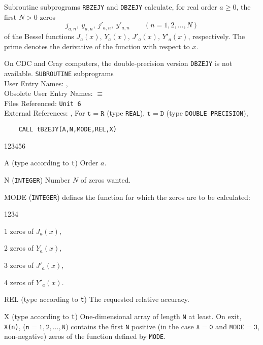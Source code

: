                 
           
\Submitter{}                
                
Subroutine subprograms {\tt RBZEJY} and {\tt DBZEJY} calculate,
for real order $a \ge 0$, the first $N > 0$ zeros
$$j_{a,n}, \ y_{a,n}, \ j'_{a,n}, \ y'_{a,n} \qquad (n=1,2,\ldots,N)$$
of the Bessel functions $J_a(x),\,Y_a(x),\,J'_a(x),\,Y'_a(x)$,
respectively. The prime denotes the derivative of the function with
respect to $x$.
\par
On CDC and Cray computers, the double-precision version
{\tt DBZEJY} is not available.
\Structure
{\tt SUBROUTINE} subprograms \\
User Entry Names: ,  \\
Obsolete User Entry Names:  $\equiv$  \\
Files Referenced: {\tt Unit 6} \\
External References: , 
\Usage
For $\mathtt{t=R}$ (type {\tt REAL}), $\mathtt{t=D}$ (type
{\tt DOUBLE PRECISION}),
\begin{verbatim}
    CALL tBZEJY(A,N,MODE,REL,X)
\end{verbatim}
\begin{DLtt}{123456}
\item[A] (type according to {\tt t}) Order $a$.
\item[N]({\tt INTEGER}) Number $N$ of zeros wanted.
\item[MODE]({\tt INTEGER}) defines the function for which the zeros
are to be calculated:
\begin{DLtt}{1234}
\item[1] zeros of $J_a(x)$,
\item[2] zeros of $Y_a(x)$,
\item[3] zeros of $J'_a(x)$,
\item[4] zeros of $Y'_a(x)$.
\end{DLtt}
\item[REL] (type according to {\tt t}) The requested relative accuracy.
\item[X] (type according to {\tt t}) One-dimensional
array of length {\tt N} at least.
On exit, {\tt X(n)}, ($\mathtt{n=1,2,\ldots,N}$) contains
the first {\tt N} positive (in the case $\mathtt{A=0}$ and
$\mathtt{MODE=3}$,
non-negative) zeros of the function defined by {\tt MODE}.
\end{DLtt}
